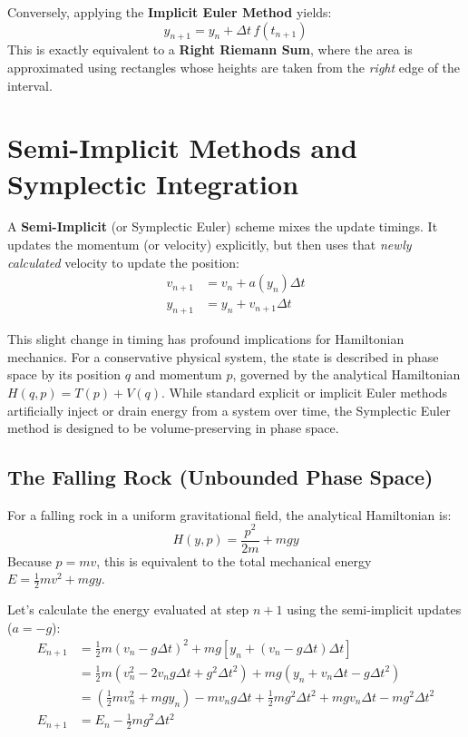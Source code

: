\documentclass[11pt]{article}
\begin{document}
Conversely, applying the \textbf{Implicit Euler Method} yields:
\begin{equation}
    y_{n+1} = y_n + \Delta t \, f(t_{n+1})
\end{equation}
This is exactly equivalent to a \textbf{Right Riemann Sum}, where the area is approximated using rectangles whose heights are taken from the \textit{right} edge of the interval.

\section{Semi-Implicit Methods and Symplectic Integration}

A \textbf{Semi-Implicit} (or Symplectic Euler) scheme mixes the update timings. It updates the momentum (or velocity) explicitly, but then uses that \textit{newly calculated} velocity to update the position:
\begin{align}
    v_{n+1} &= v_n + a(y_n) \Delta t \\
    y_{n+1} &= y_n + v_{n+1} \Delta t
\end{align}

This slight change in timing has profound implications for Hamiltonian mechanics. For a conservative physical system, the state is described in phase space by its position $q$ and momentum $p$, governed by the analytical Hamiltonian $H(q,p) = T(p) + V(q)$. While standard explicit or implicit Euler methods artificially inject or drain energy from a system over time, the Symplectic Euler method is designed to be volume-preserving in phase space. 

\subsection{The Falling Rock (Unbounded Phase Space)}
For a falling rock in a uniform gravitational field, the analytical Hamiltonian is:
\begin{equation}
    H(y, p) = \frac{p^2}{2m} + mgy
\end{equation}
Because $p = mv$, this is equivalent to the total mechanical energy $E = \frac{1}{2}mv^2 + mgy$. 

Let's calculate the energy evaluated at step $n+1$ using the semi-implicit updates ($a = -g$):
\begin{align*}
    E_{n+1} &= \frac{1}{2}m(v_n - g\Delta t)^2 + mg\left[y_n + (v_n - g\Delta t)\Delta t\right] \\
    &= \frac{1}{2}m(v_n^2 - 2v_n g \Delta t + g^2 \Delta t^2) + mg(y_n + v_n \Delta t - g\Delta t^2) \\
    &= \left( \frac{1}{2}mv_n^2 + mgy_n \right) - mv_n g \Delta t + \frac{1}{2}mg^2\Delta t^2 + mgv_n\Delta t - mg^2\Delta t^2 \\
    E_{n+1} &= E_n - \frac{1}{2}mg^2\Delta t^2
\end{align*}
\end{document}
